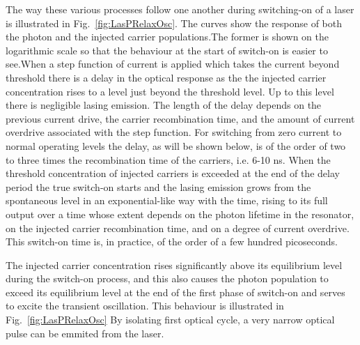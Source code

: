 The way these various processes follow one another during switching-on
of a laser is illustrated in Fig.~\ref{fig:LasPRelaxOsc}. The curves
show the response of both the photon and the injected carrier
populations.The former is shown on the logarithmic scale so that the
behaviour at the start of switch-on is easier to see.When a step
function of current is applied which takes the current beyond
threshold there is a delay in the optical response as the the injected
carrier concentration rises to a level just beyond the threshold
level. Up to this level there is negligible lasing emission. The
length of the delay depends on the previous current drive, the carrier
recombination time, and the amount of current overdrive associated
with the step function. For switching from zero current to normal
operating levels the delay, as will be shown below, is of the order of
two to three times the recombination time of the carriers, i.e. 6-10
ns. When the threshold concentration of injected carriers is exceeded
at the end of the delay period the true switch-on starts and the
lasing emission grows from the spontaneous level in an
exponential-like way with the time, rising to its full output over a
time whose extent depends on the photon lifetime in the resonator, on
the injected carrier recombination time, and on a degree of current
overdrive. This switch-on time is, in practice, of the order of a few
hundred picoseconds.

The injected carrier concentration rises significantly above its
equilibrium level during the switch-on process, and this also causes
the photon population to exceed its equilibrium level at the end of
the first phase of switch-on and serves to excite the transient
oscillation. This behaviour is illustrated in
Fig.~\ref{fig:LasPRelaxOsc} By isolating first optical cycle, a very
narrow optical pulse can be emmited from the laser.


